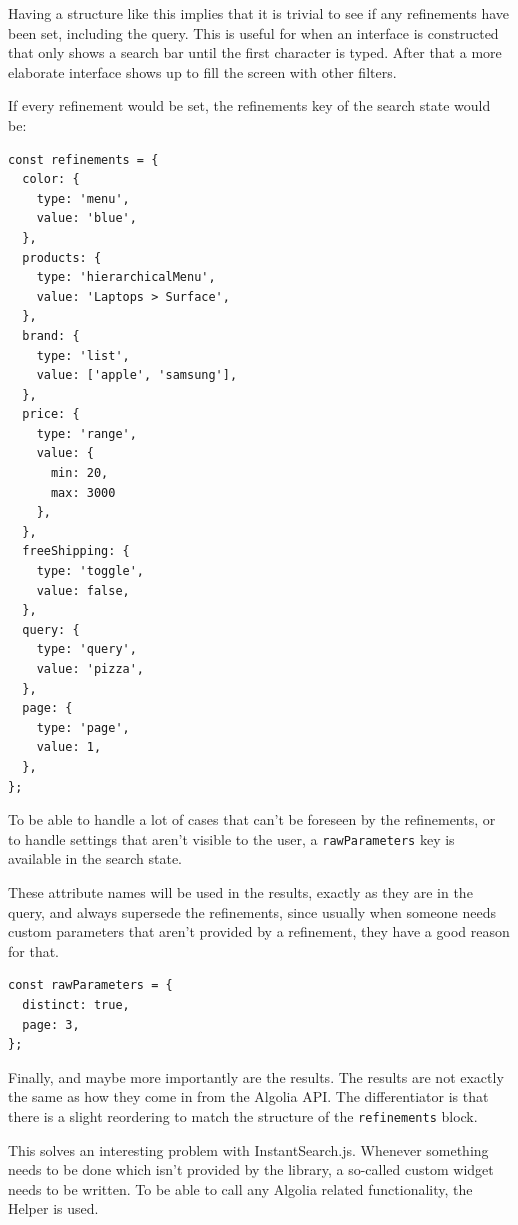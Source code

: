Having a structure like this implies that it is trivial to see if any refinements have been set, including the query. This is useful for when an interface is constructed that only shows a search bar until the first character is typed. After that a more elaborate interface shows up to fill the screen with other filters.

If every refinement would be set, the refinements key of the search state would be:

\begin{minipage}{\linewidth}
\begin{lstlisting}[caption={Refinements in InstantSearch Core},label={lst:is-core-state-2}]
const refinements = {
  color: {
    type: 'menu',
    value: 'blue',
  },
  products: {
    type: 'hierarchicalMenu',
    value: 'Laptops > Surface',
  },
  brand: {
    type: 'list',
    value: ['apple', 'samsung'],
  },
  price: {
    type: 'range',
    value: {
      min: 20,
      max: 3000
    },
  },
  freeShipping: {
    type: 'toggle',
    value: false,
  },
  query: {
    type: 'query',
    value: 'pizza',
  },
  page: {
    type: 'page',
    value: 1,
  },
};
\end{lstlisting}
\end{minipage}

To be able to handle a lot of cases that can't be foreseen by the refinements, or to handle settings that aren't visible to the user, a {\tt rawParameters} key is available in the search state. 

These attribute names will be used in the results, exactly as they are in the query, and always supersede the refinements, since usually when someone needs custom parameters that aren't provided by a refinement, they have a good reason for that.

\begin{minipage}{\linewidth}
\begin{lstlisting}[caption={Passing raw Algolia parameters to InstantSearch Core},label={lst:is-core-state-3}]
const rawParameters = {
  distinct: true,
  page: 3,
};
\end{lstlisting}
\end{minipage}

Finally, and maybe more importantly are the results. The results are not exactly the same as how they come in from the Algolia API. The differentiator is that there is a slight reordering to match the structure of the {\tt refinements} block.

This solves an interesting problem with InstantSearch.js. Whenever something needs to be done which isn't provided by the library, a so-called custom widget needs to be written. To be able to call any Algolia related functionality, the Helper is used. 


